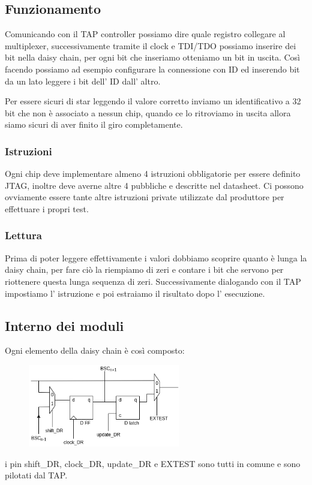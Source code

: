 \subsection{Funzionamento}
Comunicando con il TAP controller possiamo dire quale registro collegare al multiplexer, successivamente tramite il clock e TDI/TDO possiamo inserire dei bit nella daisy chain, per ogni bit che inseriamo otteniamo un bit in uscita.
Così facendo possiamo ad esempio configurare la connessione con ID ed inserendo bit da un lato leggere i bit dell' ID dall' altro.

Per essere sicuri di star leggendo il valore corretto inviamo un identificativo a 32 bit che non è associato a nessun chip, quando ce lo ritroviamo in uscita allora siamo sicuri di aver finito il giro completamente.

\subsubsection{Istruzioni}
Ogni chip deve implementare almeno 4 istruzioni obbligatorie per essere definito JTAG, inoltre deve averne altre 4 pubbliche e descritte nel datasheet.
Ci possono ovviamente essere tante altre istruzioni private utilizzate dal produttore per effettuare i propri test.

\subsubsection{Lettura}
Prima di poter leggere effettivamente i valori dobbiamo scoprire quanto è lunga la daisy chain, per fare ciò la riempiamo di zeri e contare i bit che servono per riottenere questa lunga sequenza di zeri.
Successivamente dialogando con il TAP impostiamo l' istruzione e poi estraiamo il risultato dopo l' esecuzione.

\subsection{Interno dei moduli}
Ogni elemento della daisy chain è così composto:
\begin{figure}[H]
    \centering
    \includegraphics[width=250px]{images/26_JTAG/daisy_chain_element.png}
\end{figure}
i pin shift\_DR, clock\_DR, update\_DR e EXTEST sono tutti in comune e sono pilotati dal TAP.


